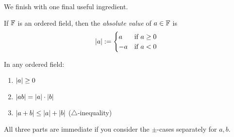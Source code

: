 We finish with one final useful ingredient.

\begin{defn}{}{}
	If $\mathbb{F}$ is an ordered field, then the \emph{absolute value} of $a\in\mathbb{F}$ is
	\[\left| a\right|:=\begin{cases}
	a&\text{if }a\ge 0\\
	-a&\text{if }a<0
	\end{cases}\]
\end{defn}

\begin{thm}{}{}
	In any ordered field:
	\begin{enumerate}
	\item $\left| a\right|\ge 0$
	\item $\left| ab\right|=\left| a\right|\cdot \left| b\right|$
	\item $\left| a+b\right|\le \left| a\right|+\left| b\right|$ \lstsp ($\triangle$-inequality)%
	\end{enumerate}
\end{thm}

All three parts are immediate if you consider the $\pm$-cases separately for $a,b$.


% 


